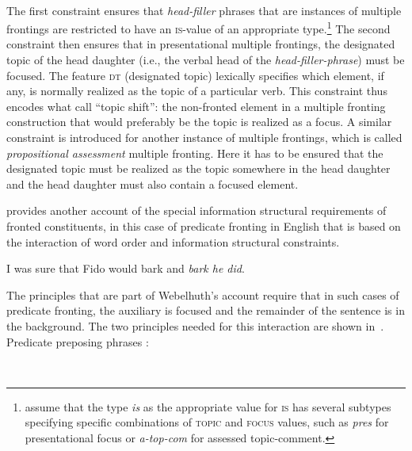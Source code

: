 \documentclass[output=paper
                ,modfonts
                ,nonflat
	        ,collection
	        ,collectionchapter
	        ,collectiontoclongg
 	        ,biblatex
                ,babelshorthands
                ,newtxmath
                ,draftmode
                ,colorlinks, citecolor=brown
]{./langsci/langscibook}
\begin{document}
\bigskip
    \begin{avm}
    \end{avm}
\impl\ 
  \begin{avm}
  \end{avm}
  \label{fig:multiplefronting}
\z
The first constraint ensures that \textit{head-filler} phrases that
are instances of multiple frontings are restricted to have an
\textsc{is}-value of an appropriate type.\footnote{\cite[75]{BC2010a}
  assume that the type \textit{is} as the appropriate value for
  \textsc{is} has several subtypes specifying specific combinations of
  \textsc{topic} and \textsc{focus} values, such as \textit{pres} for
  presentational focus or \textit{a-top-com} for
  assessed topic-comment.} The second constraint then ensures that in
presentational multiple frontings, the designated topic of the head
daughter (i.e., the verbal head of the \textit{head-filler-phrase})
must be focused. The feature \textsc{dt} (designated topic) lexically specifies which
element, if any, is normally realized as the topic of a particular
verb. This constraint thus encodes what \cite{BC2010a} call ``topic
shift'': the non-fronted element in a multiple fronting construction
that would preferably be the topic is realized as a focus. A similar
constraint is introduced for another instance of multiple frontings,
which is called \textit{propositional assessment} multiple
fronting. Here it has to be ensured that the designated topic must be
realized as the topic somewhere in the head daughter and the
head daughter must also contain a focused element.

\cite{Webelhuth2007a-u} provides another account of the special
information structural requirements of fronted constituents, in this
case of predicate fronting in English that is based on the interaction
of word order and information structural constraints.
\begin{exe}
  \ex I was sure that Fido would bark and \textit{bark he did}.
\end{exe}

The principles that are part of Webelhuth's account require that in such cases
of predicate fronting, the auxiliary is focused and the remainder of
the sentence is in the background. The two
principles needed for this interaction are shown in~.
\ea
Predicate preposing phrases \citep{Webelhuth2007a-u}:\\
  \begin{avm}
  \end{avm}
\impl\ 
\begin{avm}
\end{avm}
\end{document}
